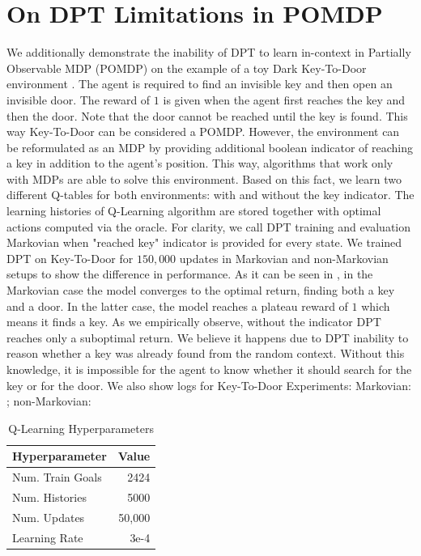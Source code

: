 \documentclass{article}
\begin{document}
\section{On DPT Limitations in POMDP}
\label{apndx:dpt-pomdp}
We additionally demonstrate the inability of DPT to learn in-context in Partially Observable MDP (POMDP) on the example of a toy Dark Key-To-Door environment \citep{laskin2022context}. The agent is required to find an invisible key and then open an invisible door. The reward of $1$ is given when the agent first reaches the key and then the door. Note that the door cannot be reached until the key is found. This way Key-To-Door can be considered a POMDP. However, the environment can be reformulated as an MDP by providing additional boolean indicator of reaching a key in addition to the agent's position. This way, algorithms that work only with MDPs are able to solve this environment.
Based on this fact, we learn two different Q-tables for both environments: with and without the key indicator. The learning histories of Q-Learning algorithm are stored together with optimal actions computed via the oracle.
For clarity, we call DPT training and evaluation Markovian when "reached key" indicator is provided for every state. We trained DPT on Key-To-Door for $150,000$ updates in Markovian and non-Markovian setups to show the difference in performance. As it can be seen in , in the Markovian case the model converges to the optimal return, finding both a key and a door. In the latter case, the model reaches a plateau reward of $1$ which means it finds a key. As we empirically observe, without the indicator DPT reaches only a suboptimal return. We believe it happens due to DPT inability to reason whether a key was already found from the random context. Without this knowledge, it is impossible for the agent to know whether it should search for the key or for the door.
We also show logs for Key-To-Door Experiments: Markovian: \href{https://wandb.ai/dunnolab/xminigrid-datasets?nw=jv26obunfp}{\color{blue}{wandb}}; non-Markovian: \href{https://wandb.ai/dunnolab/xminigrid-datasets?nw=gmm7b681xea}{\color{blue}{wandb}}
\begin{table}[h!]
\centering
\caption{Q-Learning Hyperparameters}
\label{table:q-learning-hypers}
\begin{tabular}{@{}lr@{}}
\toprule
Hyperparameter                  & Value \\
\midrule
Num. Train Goals                & 2424 \\
Num. Histories                  & 5000 \\
Num. Updates                    & 50,000 \\
Learning Rate                   & 3e-4 \\ \bottomrule
\end{tabular}
\end{table}
\end{document}
